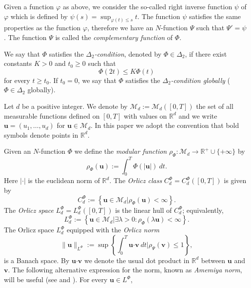 \documentclass[twoside]{elsarticle}
\theoremstyle{remark}
\newcommand{\orlnor}{\|_{L^{\Phi}}}
\newcommand{\lphi}{L^{\Phi}}
\newcommand{\claseor}{C^{\Phi}}
\renewcommand{\b}[1]{\boldsymbol{#1}}
\renewcommand{\leq}{\leqslant}
\begin{document}
Given a function $\varphi$ as above, we  consider the so-called right inverse function $\psi$ of $\varphi$ which is 
defined by $\psi(s)=\sup_{\varphi(t)\leq s}t$.
The function $\psi$ satisfies the same properties as the function $\varphi$, therefore we have an $N$-function $\Psi$ such that $\Psi'=\psi$ .
 The function $\Psi$ is called the \emph{complementary function} of $\Phi$.


We say that $\Phi$ satisfies the  \emph{$\Delta_2$-condition}, denoted by $\Phi \in \Delta_2$, 
if there exist  constants $K>0$ and  $t_0\geq 0$ such that 
\begin{equation}\label{delta2defi}\Phi(2t)\leq K\Phi(t)
\end{equation}
for every $t\geq t_0$. 
If $t_0=0$,  we say that $\Phi$ satisfies the \emph{$\Delta_2$-condition globally} ($\Phi \in \Delta_2$ globally).  


Let $d$ be a positive integer. We denote by $\mathcal{M}_d:=\mathcal{M}_d([0,T])$ the set of all measurable functions defined on $[0,T]$ with values on $\mathbb{R}^d$ and  we write $\b{u}=(u_1,\dots,u_d)$ for  $\b{u}\in \mathcal{M}_d$.
In this paper we adopt the convention that bold symbols denote points in $\mathbb{R}^d$.


Given  an $N$-function $\Phi$ we define the \emph{modular function} 
$\rho_{\Phi}:\mathcal{M}_d\to \mathbb{R}^+\cup\{+\infty\}$ by
\[\rho_{\Phi}(\b{u}):= \int_0^T \Phi(|\b{u}|)\ dt.\]
Here $|\cdot|$ is the euclidean norm of $\mathbb{R}^d$.
The \emph{Orlicz class} $C_d^{\Phi}=C_d^{\Phi}([0,T])$  is given  by
\begin{equation}\label{claseOrlicz}
  C^{\Phi}_d:=\left\{\b{u}\in \mathcal{M}_d | \rho_{\Phi}(\b{u})< \infty \right\}.
\end{equation}
The \emph{Orlicz space} $\lphi_d=L^{\Phi}_d([0,T])$ is the linear hull of $\claseor_d$;
equivalently,
\begin{equation}\label{espacioOrlicz}
\lphi_d:=\left\{ \b{u}\in \mathcal{M}_d | \exists \lambda>0: \rho_{\Phi}(\lambda \b{u}) < \infty   \right\}.
\end{equation}
  The Orlicz space $\lphi_d$ equipped with the \emph{Orlicz norm}
\[
\|  \b{u}  \orlnor:=\sup \left\{  \int_0^T \b{u}\b{\cdot} \b{v}\ dt \big| \rho_{\Psi}(\b{v})\leq 1\right\},
\]
is a Banach space. By $\b{u}\b{\cdot} \b{v}$ we denote the usual dot product in $\mathbb{R}^{d}$ between $\b{u}$ and $\b{v}$.  
The following alternative expression for the norm, known as \emph{Amemiya norm},     will  be useful (see \cite[Thm. 10.5]{KR} and \cite{hudzik2000amemiya}). For every $\b{u}\in\lphi$,
\end{document}
